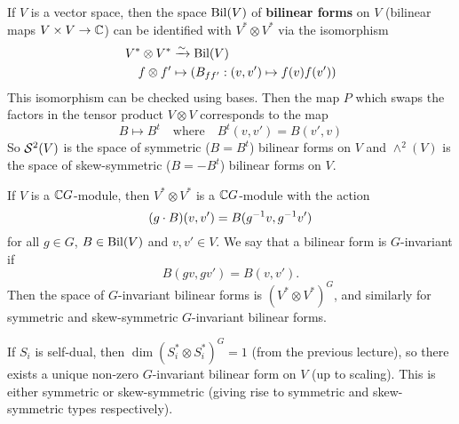 If $V$ is a vector space, then the space $\operatorname{Bil}(V)$ of \textbf{bilinear forms} on $V$ (bilinear maps $V \times V \to \mathbb{C}$) can be identified with $V^* \otimes V^*$ via the isomorphism
\begin{align*}
  V^* \otimes V^* &\xrightarrow{\sim} \operatorname{Bil}(V) \\
  f \otimes f' &\mapsto \left( B_{ff'}: (v,v') \mapsto f(v)f(v') \right)
\end{align*}
This isomorphism can be checked using bases.
Then the map $P$ which swaps the factors in the tensor product $V \otimes V$ corresponds to the map
\[ B \mapsto B^t \quad\text{where}\quad B^t(v,v') = B(v',v) \]
So $\mathcal{S}^2(V)$ is the space of symmetric ($B=B^t$) bilinear forms on $V$ and $\wedge^2(V)$ is the space of skew-symmetric ($B=-B^t$) bilinear forms on $V$.

If $V$ is a $\mathbb{C} G$-module, then $V^* \otimes V^*$ is a $\mathbb{C} G$-module with the action
\[ (g \cdot B)(v,v') = B(g^{-1} v, g^{-1} v') \]
for all $g \in G$, $B \in \operatorname{Bil}(V)$ and $v, v' \in V$.
We say that a bilinear form is $G$-invariant if
\[ B(gv,gv')=B(v,v'). \]
Then the space of $G$-invariant bilinear forms is $(V^* \otimes V^*)^G$, and similarly for symmetric and skew-symmetric $G$-invariant bilinear forms.

If $S_i$ is self-dual, then $\dim(S_i^* \otimes S_i^*)^G=1$ (from the previous lecture), so there exists a unique non-zero $G$-invariant bilinear form on $V$ (up to scaling).
This is either symmetric or skew-symmetric (giving rise to symmetric and skew-symmetric types respectively).

